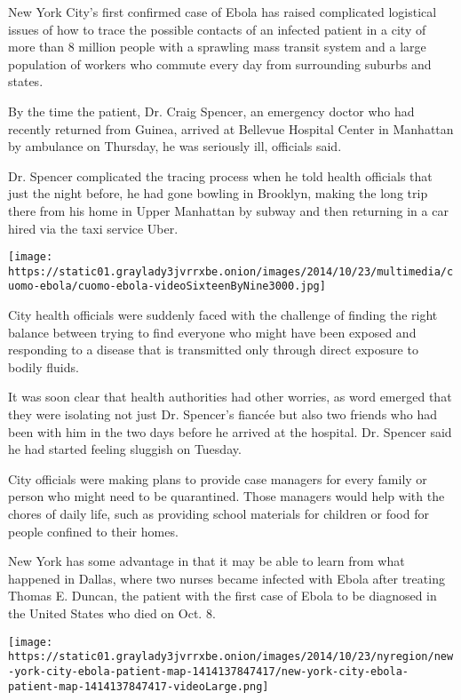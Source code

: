 New York City's first confirmed case of Ebola has raised complicated
logistical issues of how to trace the possible contacts of an infected
patient in a city of more than 8 million people with a sprawling mass
transit system and a large population of workers who commute every day
from surrounding suburbs and states.

By the time the patient, Dr. Craig Spencer, an emergency doctor who had
recently returned from Guinea, arrived at Bellevue Hospital Center in
Manhattan by ambulance on Thursday, he was seriously ill, officials
said.

Dr. Spencer complicated the tracing process when he told health
officials that just the night before, he had gone bowling in Brooklyn,
making the long trip there from his home in Upper Manhattan by subway
and then returning in a car hired via the taxi service Uber.

\texttt{[image: https://static01.graylady3jvrrxbe.onion/images/2014/10/23/multimedia/cuomo-ebola/cuomo-ebola-videoSixteenByNine3000.jpg]}

City health officials were suddenly faced with the challenge of finding
the right balance between trying to find everyone who might have been
exposed and responding to a disease that is transmitted only through
direct exposure to bodily fluids.

It was soon clear that health authorities had other worries, as word
emerged that they were isolating not just Dr. Spencer's fiancée but also
two friends who had been with him in the two days before he arrived at
the hospital. Dr. Spencer said he had started feeling sluggish on
Tuesday.

City officials were making plans to provide case managers for every
family or person who might need to be quarantined. Those managers would
help with the chores of daily life, such as providing school materials
for children or food for people confined to their homes.

New York has some advantage in that it may be able to learn from what
happened in Dallas, where two nurses became infected with Ebola after
treating Thomas E. Duncan, the patient with the first case of Ebola to
be diagnosed in the United States who died on Oct. 8.

\href{https://www.nytimes3xbfgragh.onion/interactive/2014/10/23/nyregion/new-york-city-ebola-patient-timeline-map.html}{}

\texttt{[image: https://static01.graylady3jvrrxbe.onion/images/2014/10/23/nyregion/new-york-city-ebola-patient-map-1414137847417/new-york-city-ebola-patient-map-1414137847417-videoLarge.png]}

